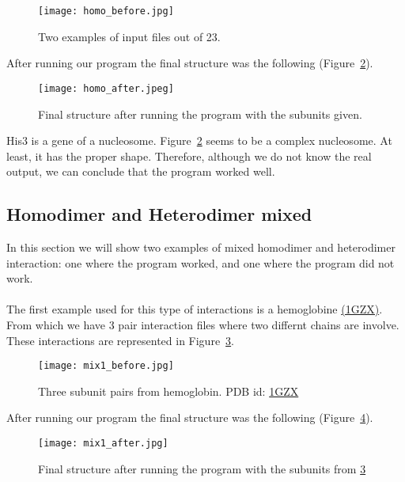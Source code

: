 \documentclass[a4paper,10pt]{report}
\begin{document}
\begin{figure}[h]
\texttt{[image: homo\_before.jpg]}
\centering
\caption{Two examples of input files out of 23.}
\label{fig:3}
\end{figure}

\noindent
After running our program the final structure was the following (Figure~\ref{fig:4}).\\

\begin{figure}[h]
\centering
\texttt{[image: homo\_after.jpeg]}
\caption{Final structure after running the program with the subunits given.}
\label{fig:4}
\end{figure}

\noindent
His3 is a gene of a nucleosome. Figure~\ref{fig:4} seems to be a complex nucleosome. At least, it has the proper shape. Therefore, although we do not know the real output, we can conclude that the program worked well.\\

\newpage

\subsection{Homodimer and Heterodimer mixed}

In this section we will show two examples of mixed homodimer and heterodimer interaction: one where the program worked, and one where the program did not work.\\\\
The first example used for this type of interactions is a hemoglobine \href{https://www.rcsb.org/structure/1gzx}{(1GZX)}. From which we have 3 pair interaction files where two differnt chains are involve. These interactions are represented in Figure~\ref{fig:5}.\\

\begin{figure}[h]
\texttt{[image: mix1\_before.jpg]}
\centering
\caption{Three subunit pairs from hemoglobin. PDB id: \href{https://www.rcsb.org/structure/1gzx}{1GZX}}
\label{fig:5}
\end{figure}

\noindent
After running our program the final structure was the following (Figure~\ref{fig:6}).\\

\begin{figure}[h]
\centering
\texttt{[image: mix1\_after.jpg]}
\caption{Final structure after running the program with the subunits from \ref{fig:5}}
\label{fig:6}
\end{figure}
\end{document}

